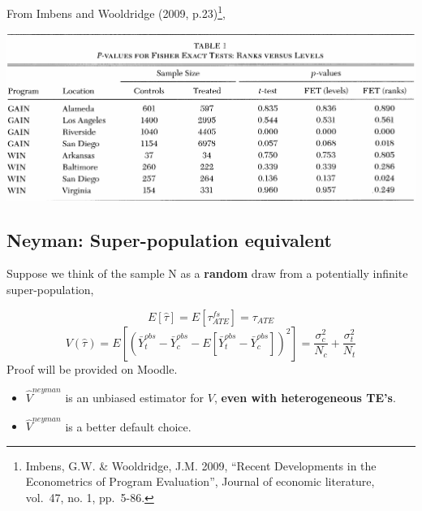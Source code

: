\documentclass[
  letterpaper,
  DIV=11,
  numbers=noendperiod]{scrreprt}
\providecommand{\tightlist}{%
  \setlength{\itemsep}{0pt}\setlength{\parskip}{0pt}}\usepackage{longtable,booktabs,array}
\theoremstyle{definition}
\theoremstyle{remark}
\begin{document}
From Imbens and Wooldridge (2009, p.23)\footnote{Imbens, G.W. \&
  Wooldridge, J.M. 2009, ``Recent Developments in the Econometrics of
  Program Evaluation'', Journal of economic literature, vol.~47, no. 1,
  pp.~5-86.},

\includegraphics{Images/table1_imbenswooldridge2009.png}

\hypertarget{neyman-super-population-equivalent}{%
\subsection{Neyman: Super-population
equivalent}\label{neyman-super-population-equivalent}}

Suppose we think of the sample N as a \textbf{random} draw from a
potentially infinite super-population,

\begin{tcolorbox}[enhanced jigsaw, breakable, colframe=quarto-callout-important-color-frame, toptitle=1mm, toprule=.15mm, opacitybacktitle=0.6, opacityback=0, rightrule=.15mm, titlerule=0mm, colback=white, bottomtitle=1mm, title={Result}, arc=.35mm, coltitle=black, colbacktitle=quarto-callout-important-color!10!white, leftrule=.75mm, bottomrule=.15mm, left=2mm]

\[
                E[\hat{\tau}] = E[\tau^{fs}_{ATE}] = \tau_{ATE}
\] \[
                V(\hat{\tau}) = E\left[(\bar{Y}^{obs}_t-\bar{Y}^{obs}_c-E[\bar{Y}^{obs}_t-\bar{Y}^{obs}_c])^2\right]= \frac{\sigma^2_c}{N_c}+\frac{\sigma^2_t}{N_t}
\] Proof will be provided on Moodle.

\end{tcolorbox}

\begin{itemize}
\tightlist
\item
  \(\hat{V}^{neyman}\) is an unbiased estimator for \(V\), \textbf{even
  with heterogeneous TE's}.
\item
  \(\hat{V}^{neyman}\) is a better default choice.
\end{itemize}
\end{document}
